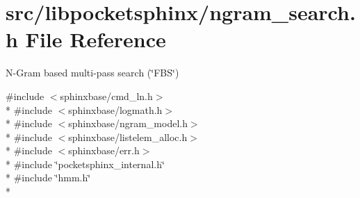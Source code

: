 \section{src/libpocketsphinx/ngram\-\_\-search.h File Reference}
\label{ngram__search_8h}


N-\/\-Gram based multi-\/pass search (\char`\"{}\-F\-B\-S\char`\"{})  


{\ttfamily \#include $<$sphinxbase/cmd\-\_\-ln.\-h$>$}\\*
{\ttfamily \#include $<$sphinxbase/logmath.\-h$>$}\\*
{\ttfamily \#include $<$sphinxbase/ngram\-\_\-model.\-h$>$}\\*
{\ttfamily \#include $<$sphinxbase/listelem\-\_\-alloc.\-h$>$}\\*
{\ttfamily \#include $<$sphinxbase/err.\-h$>$}\\*
{\ttfamily \#include \char`\"{}pocketsphinx\-\_\-internal.\-h\char`\"{}}\\*
{\ttfamily \#include \char`\"{}hmm.\-h\char`\"{}}\\*
